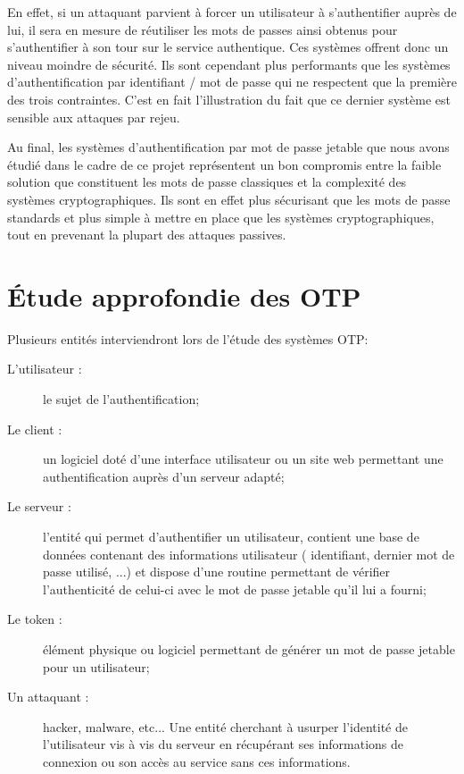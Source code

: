 	En effet, si un attaquant parvient à forcer un utilisateur à
	s'authentifier auprès de lui, il sera en mesure de réutiliser les mots de
	passes ainsi obtenus pour s'authentifier à son tour sur le service
	authentique. Ces systèmes offrent donc un niveau moindre de sécurité. Ils
	sont cependant plus performants que les systèmes d'authentification par
	identifiant / mot de passe qui ne respectent que la première des trois
	contraintes. C'est en fait l'illustration du fait que ce dernier système
	est sensible aux attaques par rejeu.

	Au final, les systèmes d'authentification par mot de passe jetable que
	nous avons étudié dans le cadre de ce projet représentent un bon compromis
	entre la faible solution que constituent les mots de passe classiques et
	la complexité des systèmes cryptographiques. Ils sont en effet plus sécurisant que les
	mots de passe standards et plus simple à mettre en place que les systèmes
	cryptographiques, tout en prevenant la plupart des attaques passives.

\section{Étude approfondie des OTP}

	Plusieurs entités interviendront lors de l'étude des systèmes OTP:

	\begin{description}
		\item[L'utilisateur :] le sujet de l'authentification;
		\item[Le client :] un logiciel doté d'une interface utilisateur ou un
		site web permettant une authentification auprès d'un serveur adapté;
		\item[Le serveur :] l'entité qui permet d'authentifier un utilisateur,
		contient une base de données contenant des informations utilisateur (
		identifiant, dernier mot de passe utilisé, ...) et dispose d'une routine
		permettant de vérifier l'authenticité de celui-ci avec le mot de passe
		jetable qu'il lui a fourni;
		\item[Le token :] élément physique ou logiciel permettant de générer
		un mot de passe jetable pour un utilisateur;
		\item[Un attaquant :] hacker, malware, etc... Une entité cherchant à
		usurper l'identité de l'utilisateur vis à vis du serveur en récupérant
		ses informations de connexion ou son accès au service sans ces
		informations.
	\end{description}

